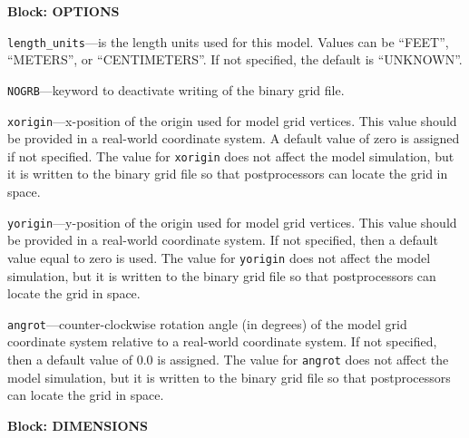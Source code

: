 
\item \textbf{Block: OPTIONS}

\begin{description}
\item \texttt{length\_units}---is the length units used for this model.  Values can be ``FEET'', ``METERS'', or ``CENTIMETERS''.  If not specified, the default is ``UNKNOWN''.

\item \texttt{NOGRB}---keyword to deactivate writing of the binary grid file.

\item \texttt{xorigin}---x-position of the origin used for model grid vertices.  This value should be provided in a real-world coordinate system.  A default value of zero is assigned if not specified.  The value for \texttt{xorigin} does not affect the model simulation, but it is written to the binary grid file so that postprocessors can locate the grid in space.

\item \texttt{yorigin}---y-position of the origin used for model grid vertices.  This value should be provided in a real-world coordinate system.  If not specified, then a default value equal to zero is used.  The value for \texttt{yorigin} does not affect the model simulation, but it is written to the binary grid file so that postprocessors can locate the grid in space.

\item \texttt{angrot}---counter-clockwise rotation angle (in degrees) of the model grid coordinate system relative to a real-world coordinate system.  If not specified, then a default value of 0.0 is assigned.  The value for \texttt{angrot} does not affect the model simulation, but it is written to the binary grid file so that postprocessors can locate the grid in space.

\end{description}
\item \textbf{Block: DIMENSIONS}

